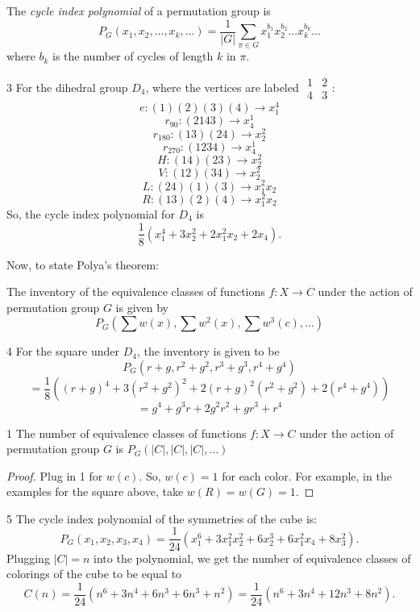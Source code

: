 \begin{definition}
    The \emph{cycle index polynomial} of a permutation group is
    \[
        P_G(x_1, x_2, \dots, x_k, \dots) = 
        \frac 1{|G|} \sum_{\pi \in G} x_1^{b_1} x_2^{b_2} \dots x_k^{b_k} \dots 
    \]
    where $b_k$ is the number of cycles of length $k$ in $\pi$. 
\end{definition}
\begin{example}3
    For the dihedral group $D_4$, where the vertices are labeled $\begin{array}{cc}1&2 \\4&3 \end{array}$:
    $$ e : (1)(2)(3)(4) \to x_1^4 $$
    $$ r_{90} : (2143) \to x_4^1 $$
    $$ r_{180} : (13)(24) \to x_2^2 $$
    $$ r_{270} : (1234) \to x_4^1 $$
    $$ H : (14)(23) \to x_2^2 $$
    $$ V : (12)(34) \to x_2^2 $$
    $$ L : (24)(1)(3) \to x_1^2x_2 $$
    $$ R : (13)(2)(4) \to x_1^2x_2 $$
    So, the cycle index polynomial for $D_4$ is 
    \[ \frac 18 (x_1^4 + 3x_2^2 + 2x_1^2 x_2 + 2x_4). \]
\end{example}
Now, to state Polya's theorem: 
\begin{theorem}
    The inventory of the equivalence classes of functions $f : X \to C$ 
    under the action of permutation group $G$ is given by 
    \[
        P_G(\sum w(x), \sum w^2(x), \sum w^3(c), \dots)
    \]
\end{theorem}
\begin{example}4
    For the square under $D_4$, the inventory is given to be 
    \[ P_G(r + g, r^2 + g^2, r^3 + g^3, r^4 + g^4)\]
    \[ = \frac 18 ((r+g)^4 + 3(r^2 + g^2)^2 + 2(r+g)^2 (r^2 + g^2) + 2(r^4 + g^4))\]
    \[ = g^4 + g^3 r + 2g^2 r^2 + gr^3 + r^4 \]
\end{example}
\begin{corollary}1
    The number of equivalence classes of functions $f : X \to C$ under the 
    action of permutation group $G$ is $P_G(|C|, |C|, |C|, \dots)$
\end{corollary}
\begin{proof}
    Plug in 1 for $w(c)$. So, $w(c) = 1$ for each color. For example,
    in the examples for the square above, take $w(R) = w(G) = 1$.
\end{proof}
\begin{example}5
    The cycle index polynomial of the symmetries of the cube is: 
    \[
        P_G(x_1, x_2, x_3, x_4) = \frac 1{24}(x_1^6 + 3x_1^2 x_2^2 + 6 x_2^3 + 6 x_1^2 x_4 + 8 x_3^2). 
    \]
    Plugging $|C| = n$ into the polynomial, we get the number of equivalence 
    classes of colorings of the cube to be equal to 
    \[ C(n) = \frac 1{24}(n^6 + 3n^4 + 6n^3 + 6 n^3 + n^2) = \frac 1{24}(n^6 + 3n^4 + 12n^3 + 8n^2).  \]
\end{example}

